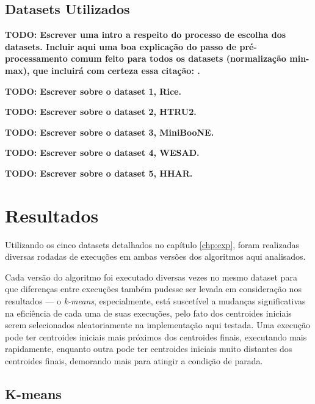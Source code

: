 \documentclass[12pt,
openright, 
oneside, %
a4paper,    %
brazil]{facom-ufu-abntex2}
\begin{document}
\section{Datasets Utilizados}
\label{sec:datasets}

\textbf{TODO: Escrever uma intro a respeito do processo de escolha dos datasets. Incluir aqui uma boa explicação do passo de pré-processamento comum feito para todos os datasets (normalização min-max), que incluirá com certeza essa citação: \cite{standardizOfVars1988}.}

\textbf{TODO: Escrever sobre o dataset 1, Rice.}

\textbf{TODO: Escrever sobre o dataset 2, HTRU2.}

\textbf{TODO: Escrever sobre o dataset 3, MiniBooNE.}

\textbf{TODO: Escrever sobre o dataset 4, WESAD.}

\textbf{TODO: Escrever sobre o dataset 5, HHAR.}






\chapter{Resultados}
\label{chp:resultados}

Utilizando os cinco datasets detalhados no capítulo \ref{chp:exp}, foram realizadas diversas rodadas de execuções em ambas versões dos algoritmos aqui analisados.

Cada versão do algoritmo foi executado diversas vezes no mesmo dataset para que diferenças entre execuções também pudesse ser levada em consideração nos resultados — o \textit{k-means}, especialmente, está suscetível a mudanças significativas na eficiência de cada uma de suas execuções, pelo fato dos centroides iniciais serem selecionados aleatoriamente na implementação aqui testada. Uma execução pode ter centroides iniciais mais próximos dos centroides finais, executando mais rapidamente, enquanto outra pode ter centroides iniciais muito distantes dos centroides finais, demorando mais para atingir a condição de parada.




\section{K-means}
\label{sec:testesDeSpeedup}
\end{document}
